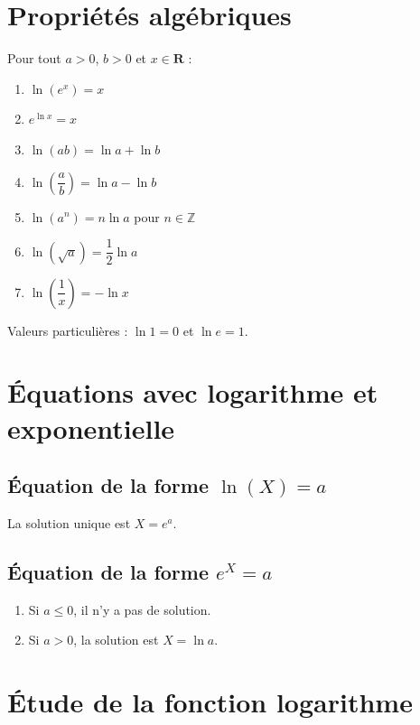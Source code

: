 \documentclass[11pt,a4paper,openany]{book}
\theoremstyle{definition}
\begin{document}
    \section{Propriétés algébriques}
    \begin{Propriété}
        Pour tout $a>0$, $b>0$ et $x\in\mathbf{R}$ :
        \begin{enumerate}
            \item $\ln(e^x)=x$
            \item $e^{\ln x}=x$
            \item $\ln(ab)=\ln a+\ln b$
            \item $\ln\!\left(\dfrac{a}{b}\right)=\ln a-\ln b$
            \item $\ln(a^n)=n\ln a$ pour $n\in\mathbb{Z}$
            \item $\ln(\sqrt{a})=\dfrac{1}{2}\ln a$
            \item $\ln\!\left(\dfrac{1}{x}\right)=-\ln x$
        \end{enumerate}
    \end{Propriété}

    \begin{Remarque}
        Valeurs particulières : $\ln 1=0$ et $\ln e=1$.
    \end{Remarque}

    \section{Équations avec logarithme et exponentielle}
    \subsection{Équation de la forme $\ln(X)=a$}
    La solution unique est $X=e^a$.

    \subsection{Équation de la forme $e^X=a$}
    \begin{enumerate}
        \item Si $a\leq 0$, il n'y a pas de solution.
        \item Si $a>0$, la solution est $X=\ln a$.
    \end{enumerate}

    \section{Étude de la fonction logarithme}
\end{document}
